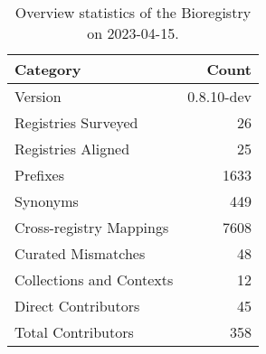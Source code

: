 \begin{table}
\caption{Overview statistics of the Bioregistry on 2023-04-15.}
\label{tab:bioregistry-summary}
\begin{tabular}{lr}
\toprule
Category & Count \\
\midrule
Version & 0.8.10-dev \\
Registries Surveyed & 26 \\
Registries Aligned & 25 \\
Prefixes & 1633 \\
Synonyms & 449 \\
Cross-registry Mappings & 7608 \\
Curated Mismatches & 48 \\
Collections and Contexts & 12 \\
Direct Contributors & 45 \\
Total Contributors & 358 \\
\bottomrule
\end{tabular}
\end{table}
